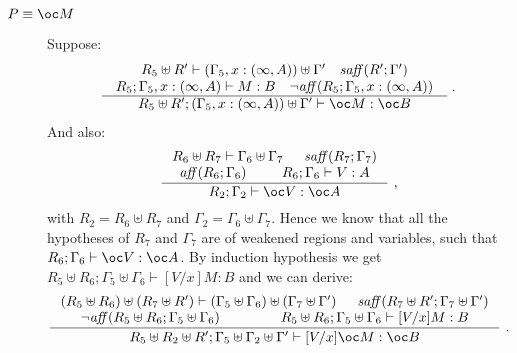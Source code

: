 \documentclass[11pt]{article}
\newcommand{\Gives}{\vdash}             \newcommand{\IGives}{\vdash_{I}}        \newcommand{\AIGives}{\vdash_{{\it AI}}} \newcommand{\CGives}{\vdash_{C}}
\newcommand{\infer}[2]{\begin{array}{c} #1 \\ \hline #2 \end{array}}
\begin{document}
\begin{description}
\item[$P\equiv\oc M$] Suppose:
        $$
        \infer{
        \begin{array}{c}
          R_5\uplus R'\Gives (\Gamma_5,x:(\infty,A))\uplus\Gamma'
          \quad \w{saff}(R';\Gamma')\\
          R_5;\Gamma_5,x:(\infty,A) \Gives M:B \quad \neg \w{aff}(R_5;\Gamma_5,x:(\infty,A))
        \end{array}}
      {R_5\uplus R';(\Gamma_5,x:(\infty,A))\uplus\Gamma' \Gives \bang M:\bang B}~.
      $$
      And also:
      $$
      \inference
      {R_6\uplus R_7\vdash\Gamma_6\uplus\Gamma_7 &
        \w{saff}(R_7;\Gamma_7)\\
        \w{aff}(R_6;\Gamma_6) & R_6;\Gamma_6\vdash V:A}
      {R_2;\Gamma_2\vdash \bang V:\bang A}~,
      $$
      with $R_2=R_6\uplus R_7$ and
      $\Gamma_2=\Gamma_6\uplus\Gamma_7$. Hence we know that all the
      hypotheses of $R_7$ and $\Gamma_7$ are of weakened regions and
      variables, such that $R_6;\Gamma_6\vdash\bang V:\bang A$. By induction hypothesis we get $R_5\uplus R_6;\Gamma_5\uplus\Gamma_6 \vdash [V/x]M:B$ and we can derive:
        $$
        \inference
        {(R_5 \uplus R_6)\uplus (R_7\uplus R')\vdash (\Gamma_5 \uplus
          \Gamma_6)\uplus (\Gamma_7\uplus \Gamma') &
          \w{saff}(R_7\uplus R';\Gamma_7\uplus\Gamma')\\
        \neg \w{aff}( R_5\uplus R_6;\Gamma_5\uplus\Gamma_6) &  R_5\uplus R_6;\Gamma_5\uplus\Gamma_6 \vdash [V/x]M:B }
        {R_5\uplus R_2\uplus
        R';\Gamma_5\uplus\Gamma_2\uplus\Gamma'\vdash
[V/x]\oc M:\oc B}~.
          $$



\end{description}
\end{document}
